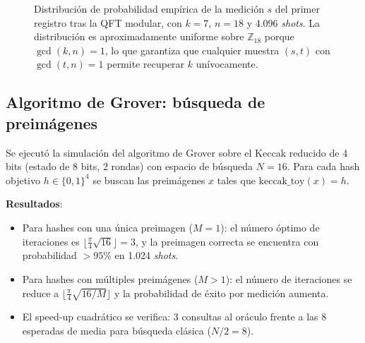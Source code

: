\begin{figure}[htbp]
\centering
{}
\caption{Distribución de probabilidad empírica de la medición $s$ del primer registro tras la QFT modular, con $k = 7$, $n = 18$ y 4.096 \emph{shots}. La distribución es aproximadamente uniforme sobre $\mathbb{Z}_{18}$ porque $\gcd(k,n) = 1$, lo que garantiza que cualquier muestra $(s,t)$ con $\gcd(t,n)=1$ permite recuperar $k$ unívocamente.}
\label{fig:dft_distribution}
\end{figure}

\subsection{Algoritmo de Grover: búsqueda de preimágenes}

Se ejecutó la simulación del algoritmo de Grover sobre el Keccak reducido de 4 bits (estado de 8 bits, 2 rondas) con espacio de búsqueda $N = 16$. Para cada hash objetivo $h \in \{0, 1\}^4$ se buscan las preimágenes $x$ tales que $\text{keccak\_toy}(x) = h$.

\textbf{Resultados}:
\begin{itemize}
  \item Para hashes con una única preimagen ($M = 1$): el número óptimo de iteraciones es $\lfloor \frac{\pi}{4}\sqrt{16} \rfloor = 3$, y la preimagen correcta se encuentra con probabilidad $> 95\%$ en 1.024 \emph{shots}.
  \item Para hashes con múltiples preimágenes ($M > 1$): el número de iteraciones se reduce a $\lfloor \frac{\pi}{4}\sqrt{16/M} \rfloor$ y la probabilidad de éxito por medición aumenta.
  \item El speed-up cuadrático se verifica: 3 consultas al oráculo frente a las 8 esperadas de media para búsqueda clásica ($N/2 = 8$).
\end{itemize}

